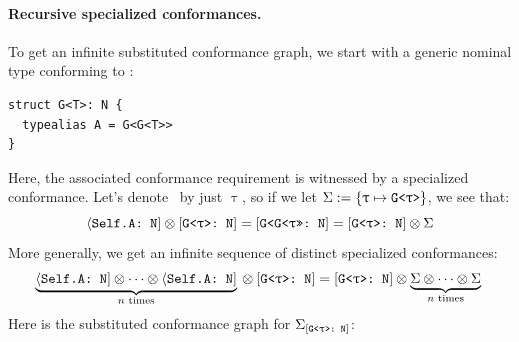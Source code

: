 \documentclass[../generics]{subfiles}
\begin{document}
\paragraph{Recursive specialized conformances.}
To get an infinite substituted conformance graph, we start with a generic nominal type conforming to \tN:
\begin{Verbatim}
struct G<T>: N {
  typealias A = G<G<T>>
}
\end{Verbatim}
Here, the associated conformance requirement is witnessed by a specialized conformance. Let's denote \rT\ by just $\uptau$, so if we let $\Sigma := \{\texttt{$\uptau$} \mapsto \texttt{G<$\uptau$>}\}$, we see that:
\[
\langle\texttt{Self.A:~N}] \otimes [\texttt{G<$\uptau$>:~N}] = [\texttt{G<G<$\uptau$>>:~N}] = [\texttt{G<$\uptau$>:~N}] \otimes \Sigma
\]
More generally, we get an infinite sequence of distinct specialized conformances:
\[
\underbrace{\langle\texttt{Self.A:~N}]\otimes\cdots\otimes\langle\texttt{Self.A:~N}]}_{\textrm{$n$ times}}{} \otimes [\texttt{G<$\uptau$>:~N}] = [\texttt{G<$\uptau$>:~N}] \otimes \underbrace{\Sigma\otimes\cdots\otimes \Sigma}_{\textrm{$n$ times}}{}
\]
Here is the substituted conformance graph for $\Sigma_{[\texttt{G<$\uptau$>:~N}]}$:
\begin{center}
\end{center}
\end{document}
